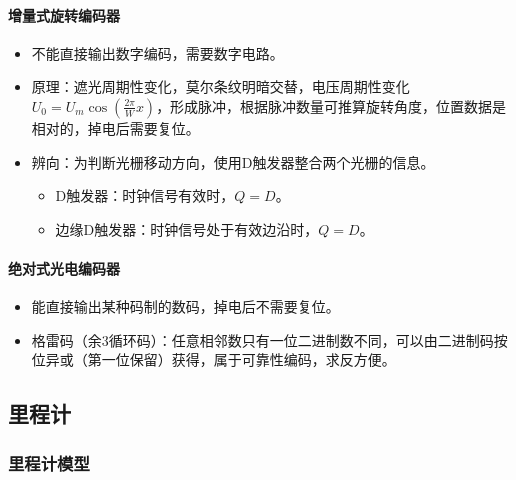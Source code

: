 \documentclass[
12pt, %
a4paper, 
oneside, %
headinclude,footinclude, %
]{scrartcl}
\begin{document}
\paragraph{增量式旋转编码器}
\begin{itemize}
\item 不能直接输出数字编码，需要数字电路。
\item 原理：遮光周期性变化，莫尔条纹明暗交替，电压周期性变化$ U_0 = U_m \cos(\frac{2\pi}{W}x) $，形成脉冲，根据脉冲数量可推算旋转角度，位置数据是相对的，掉电后需要复位。
\item 辨向：为判断光栅移动方向，使用D触发器整合两个光栅的信息。
\begin{itemize}
\item D触发器：时钟信号有效时，$ Q = D $。
\item 边缘D触发器：时钟信号处于有效边沿时，$ Q = D $。
\end{itemize}
\end{itemize}
\paragraph{绝对式光电编码器}
\begin{itemize}
\item 能直接输出某种码制的数码，掉电后不需要复位。
\item 格雷码（余$ 3 $循环码）：任意相邻数只有一位二进制数不同，可以由二进制码按位异或（第一位保留）获得，属于可靠性编码，求反方便。
\end{itemize}
\subsection[里程计]{里程计}
\subsubsection[里程计模型]{里程计模型}\label{sec:odometer}
\end{document}
